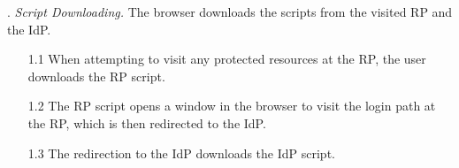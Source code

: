 

\vspace{0.4mm}
. {\em Script Downloading.}
The browser downloads the scripts from the visited RP and the IdP.
\vspace{-\topsep}
\begin{itemize}
\setlength{\topsep}{0pt}
\setlength{\partopsep}{0pt}
\setlength{\itemsep}{0pt}
\setlength{\parsep}{0pt}
\setlength{\parskip}{0pt}
\item[1.1]
When attempting to visit any protected resources at the RP,
    the user downloads the RP script.
\item[1.2]
The RP script opens a window in the browser to visit the login path at the RP, which is then redirected to the IdP.
\item[1.3]
The redirection to the IdP downloads the IdP script.
\end{itemize}



